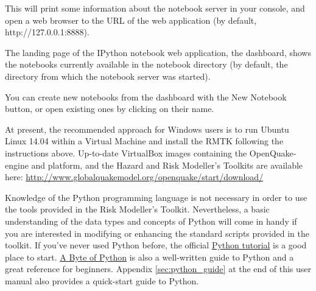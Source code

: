 This will print some information about the notebook server in your console, and open a web browser to the URL of the web application (by default, http://127.0.0.1:8888).

The landing page of the IPython notebook web application, the dashboard, shows the notebooks currently available in the notebook directory (by default, the directory from which the notebook server was started).

You can create new notebooks from the dashboard with the New Notebook button, or open existing ones by clicking on their name.

At present, the recommended approach for Windows users is to run Ubuntu Linux 14.04 within a Virtual Machine and install the RMTK following the instructions above. Up-to-date VirtualBox images containing the OpenQuake-engine and platform, and the Hazard and Risk Modeller's Toolkits are available here: \href{http://www.globalquakemodel.org/openquake/start/download/}{http://www.globalquakemodel.org/openquake/start/download/}

Knowledge of the Python programming language is not necessary in order to use the tools provided in the Risk Modeller's Toolkit. Nevertheless, a basic understanding of the data types and concepts of Python will come in handy if you are interested in modifying or enhancing the standard scripts provided in the toolkit. If you’ve never used Python before, the official \href{https://docs.python.org/2/tutorial/}{Python tutorial} is a good place to start. \href{http://www.swaroopch.com/notes/python/}{A Byte of Python} is also a well-written guide to Python and a great reference for beginners. Appendix \ref{sec:python_guide} at the end of this user manual also provides a quick-start guide to Python.